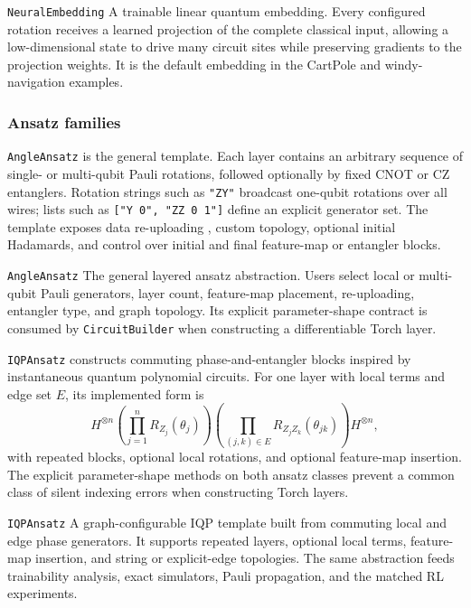 \documentclass[10pt]{article}
\newcommand{\code}[1]{\texttt{#1}}
\begin{document}
\begin{qaspfeature}{\code{NeuralEmbedding}}
A trainable linear quantum embedding.  Every configured rotation receives a
learned projection of the complete classical input, allowing a low-dimensional
state to drive many circuit sites while preserving gradients to the projection
weights.  It is the default embedding in the CartPole and windy-navigation
examples.
\end{qaspfeature}

\subsubsection{Ansatz families}

\code{AngleAnsatz} is the general template.  Each layer contains an arbitrary sequence of single- or multi-qubit Pauli rotations, followed optionally by fixed CNOT or CZ entanglers.  Rotation strings such as \code{"ZY"} broadcast one-qubit rotations over all wires; lists such as \code{["Y 0", "ZZ 0 1"]} define an explicit generator set.  The template exposes data re-uploading \cite{perezsalinas2020data}, custom topology, optional initial Hadamards, and control over initial and final feature-map or entangler blocks.

\begin{qaspfeature}{\code{AngleAnsatz}}
The general layered ansatz abstraction.  Users select local or multi-qubit
Pauli generators, layer count, feature-map placement, re-uploading, entangler
type, and graph topology.  Its explicit parameter-shape contract is consumed
by \code{CircuitBuilder} when constructing a differentiable Torch layer.
\end{qaspfeature}

\code{IQPAnsatz} constructs commuting phase-and-entangler blocks inspired by instantaneous quantum polynomial circuits.  For one layer with local terms and edge set $E$, its implemented form is
\begin{equation}
  H^{\otimes n}
  \left(\prod_{j=1}^{n}R_{Z_j}(\theta_j)\right)
  \left(\prod_{(j,k)\in E}R_{Z_jZ_k}(\theta_{jk})\right)
  H^{\otimes n},
  \label{eq:iqp}
\end{equation}
with repeated blocks, optional local rotations, and optional feature-map insertion.  The explicit parameter-shape methods on both ansatz classes prevent a common class of silent indexing errors when constructing Torch layers.

\begin{qaspfeature}{\code{IQPAnsatz}}
A graph-configurable IQP template built from commuting local and edge phase
generators.  It supports repeated layers, optional local terms, feature-map
insertion, and string or explicit-edge topologies.  The same abstraction feeds
trainability analysis, exact simulators, Pauli propagation, and the matched RL
experiments.
\end{qaspfeature}
\end{document}
